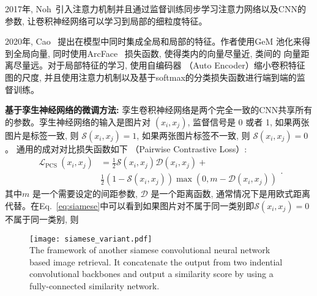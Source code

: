 2017年, Noh~\cite{noh2017large}引入注意力机制并且通过监督训练同步学习注意力网络以及CNN的参数, 让卷积神经网络可以学习到局部的细粒度特征。 \par
2020年, Cao~\cite{cao2020unifying} 提出在模型中同时集成全局和局部的特征。作者使用GeM 池化来得到全局向量, 同时使用ArcFace~\cite{deng2019arcface} 损失函数, 使得类内的向量尽量近, 类间的
向量距离尽量远。对于局部特征的学习, 使用自编码器 （Auto Encoder）缩小卷积特征图的尺度, 并且使用注意力机制以及基于softmax的分类损失函数进行端到端的监督训练。 \par
\textbf{基于孪生神经网络的微调方法:} 孪生卷积神经网络是两个完全一致的CNN共享所有的参数。孪生神经网络的输入是图片对 $(x_i, x_j)$, 监督信号是 0 或者 1, 如果两张图片是标签一致, 则 $\mathcal{S}(x_i, x_j) = 1$, 如果两张图片标签不一致, 则 $\mathcal{S}(x_i, x_j) = 0$。 通用的成对对比损失函数如下 （Pairwise Contrastive Loss）:
\begin{equation}
    \begin{aligned}
        \mathcal{L}_{\text {PCS }}\left(x_i, x_j\right) & =\frac{1}{2} \mathcal{S}\left(x_i, x_j\right) \mathcal{D}\left(x_i, x_j\right)+ \\
        & \frac{1}{2}\left(1-\mathcal{S}\left(x_i, x_j\right)\right) \max \left(0, m-\mathcal{D}\left(x_i, x_j\right)\right)
        \end{aligned}.
        \label{eq:siamese}
\end{equation}
其中$m$ 是一个需要设定的间距参数, $\mathcal{D}$ 是一个距离函数, 通常情况下是用欧式距离代替。在Eq.~\ref{eq:siamese}中可以看到如果图片对不属于同一类别即$\mathcal{S}(x_i, x_j) = 0$ 不属于同一类别, 则 
\begin{figure}[!htp]
    \centering
    \texttt{[image: siamese\_variant.pdf]} \\
      {The framework of another siamese convolutional neural network based image retrieval. It concatenate the output from two indential convolutional backbones and output a similarity score by using a fully-connected similarity network.}
   \label{fig:siamesevariant}
\end{figure}


